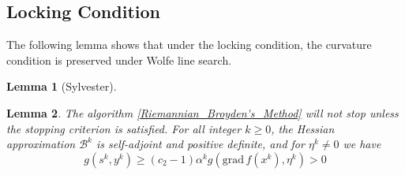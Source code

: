 \documentclass[12pt,a4paper,draft]{article}  %
\newtheorem{lemma}{Lemma}[section]
\theoremstyle{definition}
\numberwithin{equation}{section}
\newcommand{\grad}{\mathrm{grad}\,}
\begin{document}
\subsection{Locking Condition}
The following lemma shows that under the locking condition, the curvature condition is preserved under Wolfe line search.
\begin{lemma}[Sylvester]
        
\end{lemma}
\begin{lemma}\label{curvature_condition_riemannian_lemma}
        The algorithm \ref{Riemannian_Broyden's_Method} will not stop unless the stopping criterion is satisfied. For all integer $k\geq 0$, the Hessian approximation $\mathcal{B}^k$ is self-adjoint and positive definite, and for $\eta^k\neq 0$ we have
        \begin{equation}
                g(s^k,y^k)\geq (c_2-1)\alpha^k g(\grad f(x^k), \eta^k) > 0
        \end{equation}
\end{lemma}
\end{document}
